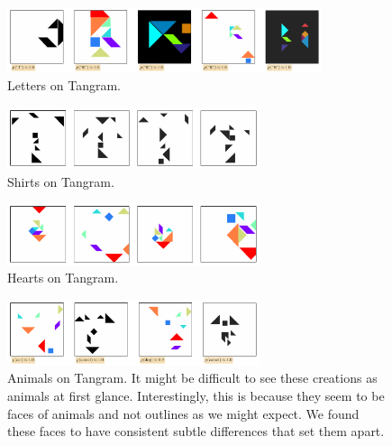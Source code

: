 \begin{figure}[H]
    \centering
    \includegraphics[width=0.824\textwidth]{images/curation_letters.pdf}
    \caption{Letters on Tangram.}
    \label{fig:curation_letters}
\end{figure}

\begin{figure}[H]
    \centering
    \includegraphics[width=0.66\textwidth]{images/curation_shirt_all.pdf}
    \caption{Shirts on Tangram.}
    \label{fig:curation_shirt_all}
\end{figure}

\begin{figure}[H]
    \centering
    \includegraphics[width=0.66\textwidth]{images/curation_heart.pdf}
    \caption{Hearts on Tangram.}
    \label{fig:curation_heart}
\end{figure}


\begin{figure}[H]
    \centering
    \includegraphics[width=0.66\textwidth]{images/curation_faces_all.pdf}
    \captionsetup{margin=72pt}
    \caption[Animals on Tangram.]{Animals on Tangram. It might be difficult to see these creations as animals at first glance.
    Interestingly, this is because they seem to be faces of animals and not outlines as we might expect. We found these faces to have consistent subtle differences that set them apart.}
    \label{fig:curation_animals}
\end{figure}

